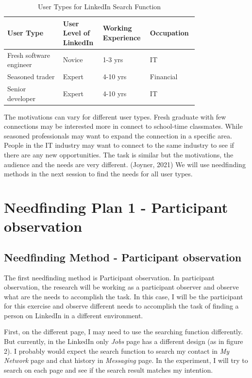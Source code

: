 \documentclass[
	letterpaper, %
]{jdf}
\begin{document}
\begin{table}[h] %
	\caption{User Types for LinkedIn Search Function}
	\small %
	\centering %
	\begin{tabular}{L{0.27\linewidth} L{0.17\linewidth} L{0.17\linewidth} L{0.17\linewidth}}
		\textbf{User Type} & \textbf{User Level of LinkedIn} & \textbf{Working Experience} & \textbf{Occupation} \\
		\toprule[0.5pt]
		Fresh software engineer & Novice & 1-3 yrs & IT\\
		\midrule
		Seasoned trader & Expert & 4-10 yrs & Financial\\
		\midrule
		Senior developer & Expert & 4-10 yrs & IT\\

	\end{tabular}
\end{table}

The motivations can vary for different user types. Fresh graduate with few connections may be interested more in connect to school-time classmates. While seasoned professionals may want to expand the connection in a specific area. People in the IT industry may want to connect to the same industry to see if there are any new opportunities. The task is similar but the motivations, the audience and the needs are very different. (Joyner, 2021) We will use needfinding methods in the next session to find the needs for all user types. 

\section{Needfinding Plan 1 - Participant observation}
\subsection{Needfinding Method - Participant observation}
The first needfinding method is Participant observation. In participant observation, the research will be working as a participant observer and observe what are the needs to accomplish the task. In this case, I will be the participant for this exercise and observe different needs to accomplish the task of finding a person on LinkedIn in a different environment. 

First, on the different page, I may need to use the searching function differently. But currently, in the LinkedIn only \emph{Jobs} page has a different design (as in figure 2). I probably would expect the search function to search my contact in \emph{My Network} page and chat history in \emph{Messaging} page. In the experiment, I will try to search on each page and see if the search result matches my intention.
\end{document}
